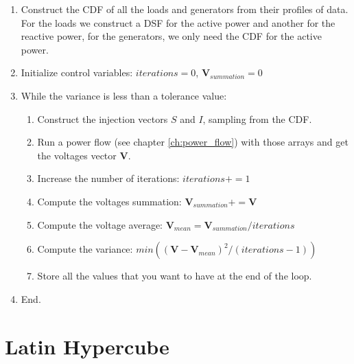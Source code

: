 \documentclass[a4paper,twoside,fleqn]{tufte-book}
\begin{document}
\begin{enumerate}
	\item Construct the CDF of all the loads and generators from their profiles of data. For the loads we construct a DSF for the active power and another for the reactive power, for the generators, we only need the CDF for the active power.
	
	\item Initialize control variables: $iterations = 0$, $\textbf{V}_{summation} = 0$
	
	\item While the variance is less than a tolerance value:
	
	\begin{enumerate}
		\item Construct the injection vectors $S$ and $I$, sampling from the CDF.
		
		\item Run a power flow (see chapter \ref{ch:power_flow}) with those arrays and get the voltages vector $\textbf{V}$.
		
		\item Increase the number of iterations: $iterations += 1$
		
		\item Compute the voltages summation: $\textbf{V}_{summation} += \textbf{V}$
		
		\item Compute the voltage average: $\textbf{V}_{mean} = \textbf{V}_{summation} / iterations$
		
		\item Compute the variance: $min((\textbf{V} - \textbf{V}_{mean})^2 / (iterations - 1))$
		
		\item Store all the values that you want to have at the end of the loop.
		
	\end{enumerate}

	\item End.
\end{enumerate}






\section{Latin Hypercube}




\end{document}
